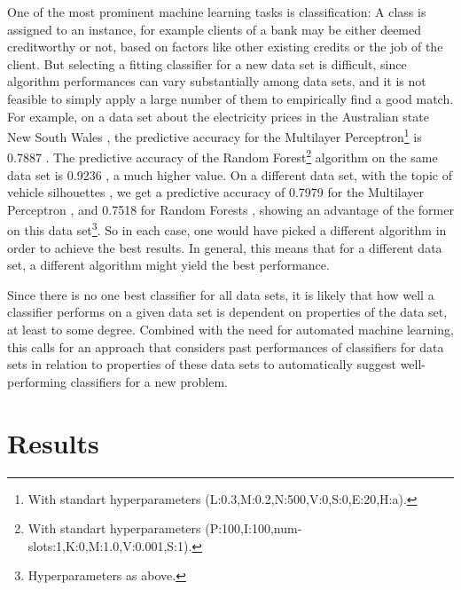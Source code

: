 One of the most prominent machine learning tasks is classification: A class is assigned to an instance, for example clients of a bank may be either deemed creditworthy or not, based on factors like other existing credits or the job of the client. But selecting a fitting classifier for a new data set is difficult, since algorithm performances can vary substantially among data sets, and it is not feasible to simply apply a large number of them to empirically find a good match. For example, on a data set about the electricity prices in the Australian state New South Wales \cite{harris1999splice}, the predictive accuracy for the Multilayer Perceptron\footnote{With standart hyperparameters (L:0.3,M:0.2,N:500,V:0,S:0,E:20,H:a).} is 0.7887 \cite{cachada2017run3}. The predictive accuracy of the Random Forest\footnote{With standart hyperparameters (P:100,I:100,num-slots:1,K:0,M:1.0,V:0.001,S:1).} algorithm on the same data set is 0.9236 \cite{cachada2017run}, a much higher value. On a different data set, with the topic of vehicle silhouettes \cite{siebert1987vehicle}, we get a predictive accuracy of 0.7979 for the Multilayer Perceptron \cite{cachada2017run4}, and 0.7518 for Random Forests \cite{cachada2017run2}, showing an advantage of the former on this data set\footnote{Hyperparameters as above.}. So in each case, one would have picked a different algorithm in order to achieve the best results. In general, this means that for a different data set, a different algorithm might yield the best performance.

Since there is no one best classifier for all data sets, it is likely that how well a classifier performs on a given data set is dependent on properties of the data set, at least to some degree. Combined with the need for automated machine learning, this calls for an approach that considers past performances of classifiers for data sets in relation to properties of these data sets to automatically suggest well-performing classifiers for a new problem.


\section{Results}
\label{sec:intro:results}

